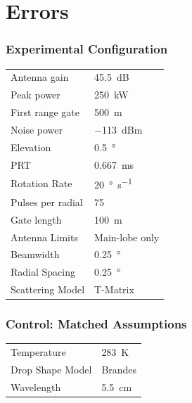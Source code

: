 \documentclass[red]{beamer}
\begin{document}
\section{Errors}
\begin{frame}
	\frametitle{Experimental Configuration}
	\begin{center}
	    \begin{tabular}{ | l | l | }
	        \hline
	        Antenna gain & \SI{45.5}{dB} \\
	        Peak power & \SI{250}{\kilo\watt} \\
	        First range gate & \SI{500}{\meter} \\
	        Noise power & \SI{-113}{dBm} \\
	        Elevation & \SI{0.5}{\degree} \\
	        PRT & \SI{0.667}{\milli\second} \\
	        Rotation Rate & \SI{20}{\degree\per\second} \\
	        Pulses per radial & \num{75} \\
	        Gate length & \SI{100}{\meter} \\
	        Antenna Limits & Main-lobe only \\
			Beamwidth & \SI{0.25}{\degree} \\
			Radial Spacing & \SI{0.25}{\degree} \\
			Scattering Model & T-Matrix \\
			\hline
	    \end{tabular}
	\end{center}
\end{frame}

\begin{frame}
	\frametitle{Control: Matched Assumptions}
	\begin{center}
	    \begin{tabular}{ | l | l | }
	        \hline
	        Temperature & \SI{283}{\kelvin} \\
	        Drop Shape Model & Brandes \\
	        Wavelength & \SI{5.5}{\centi\meter} \\
			\hline
	    \end{tabular}
	\end{center}	
\end{frame}
\end{document}
